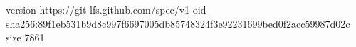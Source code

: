 version https://git-lfs.github.com/spec/v1
oid sha256:89f1eb531b9d8c997f6697005db85748324f3e92231699bed0f2acc59987d02c
size 7861
